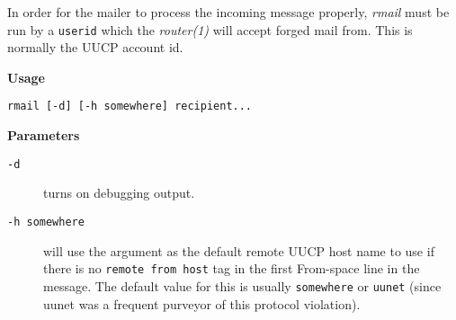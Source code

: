 In order for the mailer to process the incoming message
properly, {\em rmail\/} must be run by a {\tt userid} which the
{\em router(1)\/} will accept forged mail from. This is normally
the UUCP account id.

{\bf Usage}

{\tt rmail [-d] [-h somewhere] recipient...}

{\bf Parameters}

\begin{description}
\item[ {\tt -d}] \mbox{}

turns on debugging output.



\item[ {\tt -h somewhere}] \mbox{}

will use the argument as the 
default remote UUCP host name to use if there is no {\tt remote from host}
tag in the first From-space line in  the message.
The  default value for this is usually {\tt somewhere} or
{\tt uunet} (since uunet was a frequent purveyor of this
protocol violation).

\end{description}

